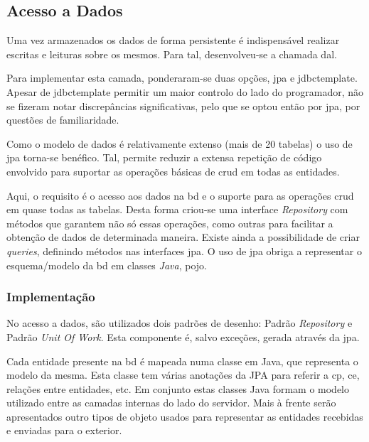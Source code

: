 %
%
\subsection{Acesso a Dados}\label{subsec453}

Uma vez armazenados os dados de forma persistente é indispensável realizar escritas e leituras sobre os mesmos. Para tal, desenvolveu-se a chamada \acrfull{dal}. 

Para implementar esta camada, ponderaram-se duas opções, \gls{jpa} e \gls{jdbctemplate}. Apesar de \acrshort{jdbctemplate} permitir um maior controlo do lado do programador, não se fizeram notar discrepâncias significativas, pelo que se optou então por \acrshort{jpa}, por questões de familiaridade.

Como o modelo de dados é relativamente extenso (mais de 20 tabelas) o uso de \acrshort{jpa} torna-se benéfico. Tal, permite reduzir a extensa repetição de código envolvido para suportar as operações básicas de \acrfull{crud} em todas as entidades. 

Aqui, o requisito é o acesso aos dados na \acrshort{bd} e o suporte para as operações \acrshort{crud} em quase todas as tabelas. Desta forma criou-se uma interface \textit{Repository} com métodos que garantem não só essas operações, como outras para facilitar a obtenção de dados de determinada maneira. Existe ainda a possibilidade de criar \textit{queries}, definindo métodos nas interfaces \acrshort{jpa}. O uso de \acrshort{jpa} obriga a representar o esquema/modelo da \acrshort{bd} em classes \textit{Java}, \acrfull{pojo}.

 \subsubsection{Implementação}\label{subsubsec4531}
 
 No acesso a dados, são utilizados dois padrões de desenho: Padrão \textit{Repository} e Padrão \textit{Unit Of Work}. Esta componente é, salvo exceções, gerada através da \acrshort{jpa}.
 
 Cada entidade presente na \acrshort{bd} é mapeada numa classe em Java, que representa o modelo da mesma. Esta classe tem várias anotações da JPA para referir a \acrlong{cp}, \acrlong{ce}, relações entre entidades, etc. Em conjunto estas classes Java formam o modelo utilizado entre as camadas internas do lado do servidor. Mais à frente serão apresentados outro tipos de objeto usados para representar as entidades recebidas e enviadas para o exterior.
 
 
